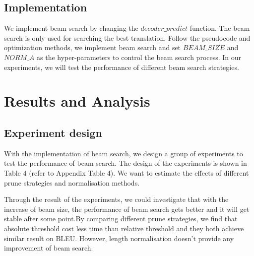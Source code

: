\documentclass[a4paper]{article}
\begin{document}
\subsection{Implementation}
We implement beam search by changing the $decoder\_predict$ function. The beam search is only used for searching the best translation. Follow the pseudocode and optimization methods, we implement beam search and set $BEAM\_SIZE$ and $NORM\_A$ as the hyper-parameters to control the beam search process. In our experiments, we will test the performance of different beam search strategies.

\section{Results and Analysis}

\subsection{Experiment design}
With the implementation of beam search, we design a group of experiments to test the performance of beam search. The design of the experiments is shown in Table 4 (refer to Appendix Table 4). We want to estimate the effects of different prune strategies and normalisation methods.

Through the result of the experiments, we could investigate that with the increase of beam size, the performance of beam search gets better and it will get stable after some point.By comparing different prune strategies, we find that absolute threshold cost less time than relative threshold and they both achieve similar result on BLEU. However, length normalisation doesn't provide any improvement of beam search.
\end{document}

